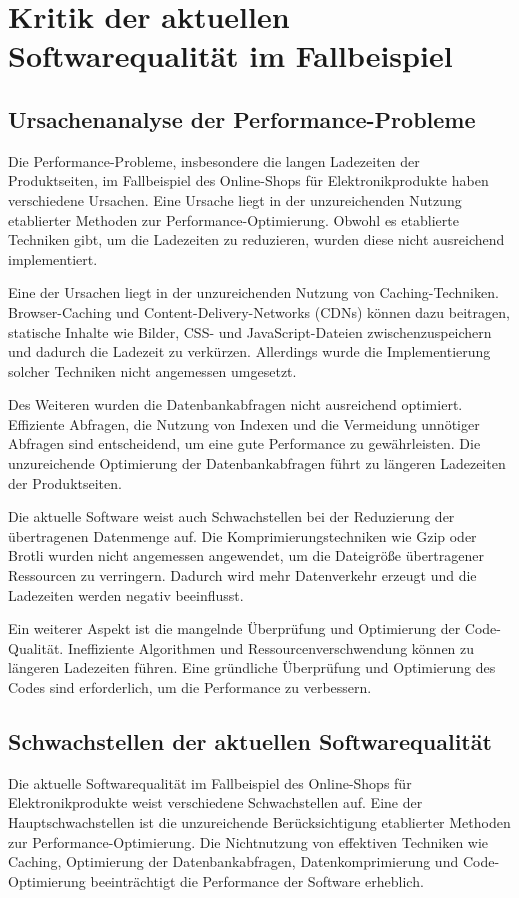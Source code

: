 \section{Kritik der aktuellen Softwarequalität im Fallbeispiel}

\subsection{Ursachenanalyse der Performance-Probleme}
Die Performance-Probleme, insbesondere die langen Ladezeiten der Produktseiten, im Fallbeispiel des Online-Shops für Elektronikprodukte haben verschiedene Ursachen. Eine Ursache liegt in der unzureichenden Nutzung etablierter Methoden zur Performance-Optimierung. Obwohl es etablierte Techniken gibt, um die Ladezeiten zu reduzieren, wurden diese nicht ausreichend implementiert.

Eine der Ursachen liegt in der unzureichenden Nutzung von Caching-Techniken. Browser-Caching und Content-Delivery-Networks (CDNs) können dazu beitragen, statische Inhalte wie Bilder, CSS- und JavaScript-Dateien zwischenzuspeichern und dadurch die Ladezeit zu verkürzen. Allerdings wurde die Implementierung solcher Techniken nicht angemessen umgesetzt.

Des Weiteren wurden die Datenbankabfragen nicht ausreichend optimiert. Effiziente Abfragen, die Nutzung von Indexen und die Vermeidung unnötiger Abfragen sind entscheidend, um eine gute Performance zu gewährleisten. Die unzureichende Optimierung der Datenbankabfragen führt zu längeren Ladezeiten der Produktseiten.

Die aktuelle Software weist auch Schwachstellen bei der Reduzierung der übertragenen Datenmenge auf. Die Komprimierungstechniken wie Gzip oder Brotli wurden nicht angemessen angewendet, um die Dateigröße übertragener Ressourcen zu verringern. Dadurch wird mehr Datenverkehr erzeugt und die Ladezeiten werden negativ beeinflusst.

Ein weiterer Aspekt ist die mangelnde Überprüfung und Optimierung der Code-Qualität. Ineffiziente Algorithmen und Ressourcenverschwendung können zu längeren Ladezeiten führen. Eine gründliche Überprüfung und Optimierung des Codes sind erforderlich, um die Performance zu verbessern.

\subsection{Schwachstellen der aktuellen Softwarequalität}
Die aktuelle Softwarequalität im Fallbeispiel des Online-Shops für Elektronikprodukte weist verschiedene Schwachstellen auf. Eine der Hauptschwachstellen ist die unzureichende Berücksichtigung etablierter Methoden zur Performance-Optimierung. Die Nichtnutzung von effektiven Techniken wie Caching, Optimierung der Datenbankabfragen, Datenkomprimierung und Code-Optimierung beeinträchtigt die Performance der Software erheblich.

